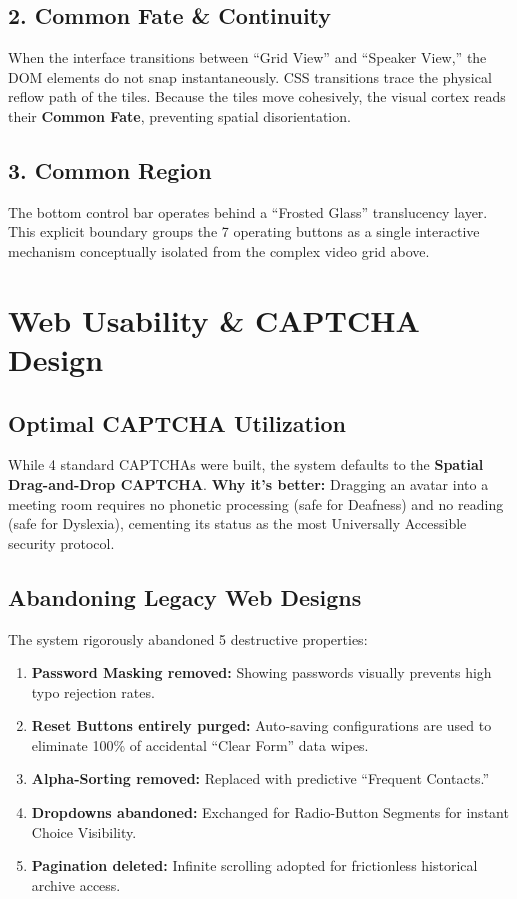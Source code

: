 \documentclass[12pt,a4paper]{article}
\begin{document}
\subsection{2. Common Fate \& Continuity}
When the interface transitions between ``Grid View'' and ``Speaker View,'' the DOM elements do not snap instantaneously. CSS transitions trace the physical reflow path of the tiles. Because the tiles move cohesively, the visual cortex reads their \textbf{Common Fate}, preventing spatial disorientation.

\subsection{3. Common Region}
The bottom control bar operates behind a ``Frosted Glass'' translucency layer. This explicit boundary groups the 7 operating buttons as a single interactive mechanism conceptually isolated from the complex video grid above.

\section{Web Usability \& CAPTCHA Design}

\subsection{Optimal CAPTCHA Utilization}
While 4 standard CAPTCHAs were built, the system defaults to the \textbf{Spatial Drag-and-Drop CAPTCHA}. 
\textbf{Why it’s better:} Dragging an avatar into a meeting room requires no phonetic processing (safe for Deafness) and no reading (safe for Dyslexia), cementing its status as the most Universally Accessible security protocol.

\subsection{Abandoning Legacy Web Designs}
The system rigorously abandoned 5 destructive properties:
\begin{enumerate}
    \item \textbf{Password Masking removed:} Showing passwords visually prevents high typo rejection rates.
    \item \textbf{Reset Buttons entirely purged:} Auto-saving configurations are used to eliminate 100\% of accidental ``Clear Form'' data wipes.
    \item \textbf{Alpha-Sorting removed:} Replaced with predictive ``Frequent Contacts.''
    \item \textbf{Dropdowns abandoned:} Exchanged for Radio-Button Segments for instant Choice Visibility.
    \item \textbf{Pagination deleted:} Infinite scrolling adopted for frictionless historical archive access.
\end{enumerate}
\end{document}
